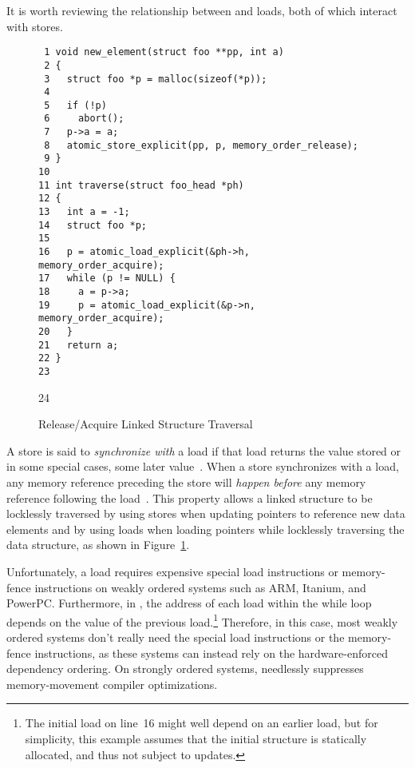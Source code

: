 \documentclass[letterpaper,twocolumn,10pt]{article}
\begin{document}
It is worth reviewing the relationship between 
and  loads, both of which interact with
 stores.

\begin{figure}[tbp]
{ \scriptsize
\begin{verbatim}
 1 void new_element(struct foo **pp, int a)
 2 {
 3   struct foo *p = malloc(sizeof(*p));
 4 
 5   if (!p)
 6     abort();
 7   p->a = a;
 8   atomic_store_explicit(pp, p, memory_order_release);
 9 }
10 
11 int traverse(struct foo_head *ph)
12 {
13   int a = -1;
14   struct foo *p;
15 
16   p = atomic_load_explicit(&ph->h, memory_order_acquire);
17   while (p != NULL) {
18     a = p->a;
19     p = atomic_load_explicit(&p->n, memory_order_acquire);
20   }
21   return a;
22 }
23 \end{verbatim}
24 }
\caption{Release/Acquire Linked Structure Traversal}
\label{fig:Release/Acquire Linked Structure Traversal}
\end{figure}

A  store is said to \emph{synchronize with}
a  load if that load returns the value stored
or in some special cases, some later
value~\cite[1.10p9-1.10p10]{RichardSmith2015N4527}.
When a  store synchronizes with a
 load, any memory reference preceding the
 store will \emph{happen before}
any memory reference following the
 load~\cite[1.10p13-1.10p14]{RichardSmith2015N4527}.
This property allows a linked structure to be locklessly traversed
by using  stores when updating pointers to
reference new data elements and by using 
loads when loading pointers while locklessly traversing the data
structure, as shown in
Figure~\ref{fig:Release/Acquire Linked Structure Traversal}.

Unfortunately, a  load requires expensive
special load instructions or memory-fence instructions on weakly
ordered systems such as ARM, Itanium, and PowerPC.
Furthermore, in , the address of each
 load within the while loop depends on the value
of the previous  load.\footnote{
	The initial load on line~16 might well depend on an earlier
	load, but for simplicity, this example assumes that the
	initial  structure is statically allocated,
	and thus not subject to updates.}
Therefore, in this case, most weakly ordered systems don't really need
the special load instructions or the memory-fence instructions,
as these systems can instead rely on the hardware-enforced dependency
ordering.
On strongly ordered systems,  needlessly
suppresses memory-movement compiler optimizations.
\end{document}
